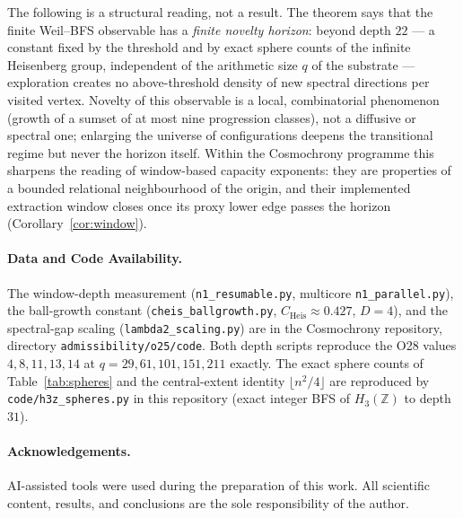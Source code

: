 \documentclass[11pt,a4paper]{article}
\theoremstyle{plain}
\theoremstyle{definition}
\newcommand{\Cheis}{C_{\mathrm{Heis}}}
\begin{document}
      The following is a structural reading, not a result.
      The theorem says that the finite Weil--BFS observable has a \emph{finite novelty horizon}:
      beyond depth $22$ --- a constant fixed by the threshold and by exact sphere counts of the
      infinite Heisenberg group, independent of the arithmetic size $q$ of the substrate ---
      exploration creates no above-threshold density of new spectral directions per visited vertex.
      Novelty of this observable is a local, combinatorial phenomenon (growth of a sumset of at
      most nine progression classes), not a diffusive or spectral one; enlarging the universe of
      configurations deepens the transitional regime but never the horizon itself.
      Within the Cosmochrony programme this sharpens the reading of window-based capacity
      exponents: they are properties of a bounded relational neighbourhood of the origin, and
      their implemented extraction window closes once its proxy lower edge passes the horizon
      (Corollary~\ref{cor:window}).

    \paragraph{Data and Code Availability.}
      The window-depth measurement (\texttt{n1\_resumable.py}, multicore
      \texttt{n1\_parallel.py}), the ball-growth constant (\texttt{cheis\_ballgrowth.py},
      $\Cheis \approx 0.427$, $D = 4$), and the spectral-gap scaling
      (\texttt{lambda2\_scaling.py}) are in the Cosmochrony repository, directory
      \texttt{admissibility/o25/code}.
      Both depth scripts reproduce the O28 values $4, 8, 11, 13, 14$ at
      $q = 29, 61, 101, 151, 211$ exactly.
      The exact sphere counts of Table~\ref{tab:spheres} and the central-extent identity
      $\lfloor n^2/4\rfloor$ are reproduced by \texttt{code/h3z\_spheres.py} in this repository
      (exact integer BFS of $H_3(\mathbb{Z})$ to depth $31$).

    \paragraph{Acknowledgements.}
      AI-assisted tools were used during the preparation of this work.
      All scientific content, results, and conclusions are the sole responsibility of the author.

  \newpage
  
  
\end{document}

